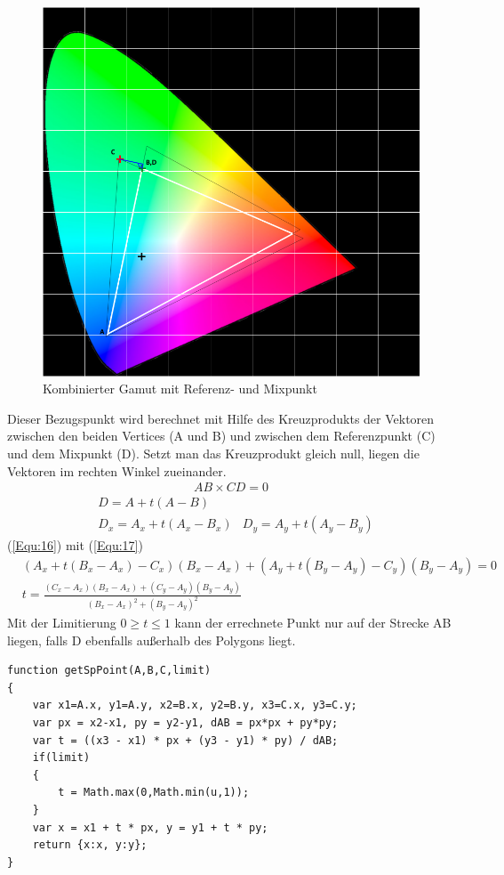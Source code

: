 \documentclass[11pt]{scrartcl}
\begin{document}
\begin{figure}[H]
    \begin{center}
        \includegraphics[width=.7\textwidth]{images/combined_gamut_with_mix_point_and_math.png} %
    \end{center}
    \caption{Kombinierter Gamut mit Referenz- und Mixpunkt}\label{fig:refCombined}
\end{figure}
\noindent
Dieser Bezugspunkt wird berechnet mit Hilfe des Kreuzprodukts der Vektoren zwischen den beiden Vertices (A und B) und zwischen dem Referenzpunkt (C)
und dem Mixpunkt (D). Setzt man das Kreuzprodukt gleich null, liegen die Vektoren im rechten Winkel zueinander.
\begin{align}\label{Equ:16}
    AB \times CD = 0
\end{align}
\begin{align}\label{Equ:17}
    &D = A + t(A - B)\\
    &D_x = A_x + t(A_x - B_x)
    &D_y = A_y + t(A_y - B_y)
\end{align}
(\ref{Equ:16}) mit (\ref{Equ:17})
\begin{align}\label{Equ:18}
    &(A_x+t(B_x-A_x)-C_x)(B_x-A_x)+(A_y+t(B_y-A_y)-C_y)(B_y-A_y)=0\\
    &t = \frac{(C_x-A_x)(B_x-A_x)+(C_y-A_y)(B_y-A_y)}{(B_x-A_x)^2+(B_y-A_y)^2}
\end{align}
Mit der Limitierung $0 \geq t \leq 1$ kann der errechnete Punkt nur auf der Strecke AB liegen, falls D ebenfalls außerhalb des Polygons liegt.\\
\begin{lstlisting}[caption=Mixpunktermittlung]
function getSpPoint(A,B,C,limit)
{
    var x1=A.x, y1=A.y, x2=B.x, y2=B.y, x3=C.x, y3=C.y;
    var px = x2-x1, py = y2-y1, dAB = px*px + py*py;
    var t = ((x3 - x1) * px + (y3 - y1) * py) / dAB;
    if(limit)
    {
        t = Math.max(0,Math.min(u,1));
    }
    var x = x1 + t * px, y = y1 + t * py;
    return {x:x, y:y};
}
\end{lstlisting}
\end{document}
